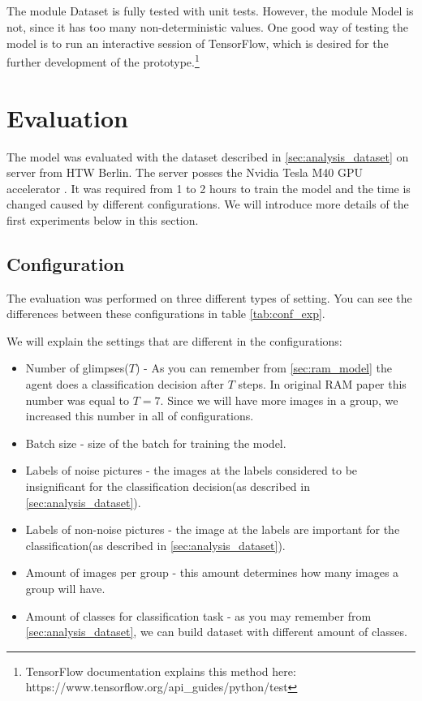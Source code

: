 \subparagraph{} The module Dataset is fully tested with unit tests. However,
the module Model is not, since it has too many non-deterministic values.
One good way of testing the model is to run an interactive session of TensorFlow,
which is desired for the further development of the prototype.\footnote{
TensorFlow documentation explains this method here: https://www.tensorflow.org/api\_guides/python/test
}

\section{Evaluation} The model was evaluated with the dataset described
in \autoref{sec:analysis_dataset} on server from HTW Berlin. The server
posses the Nvidia Tesla M40 GPU accelerator \cite{NVIDIA}.
It was required from 1 to 2 hours to train the model and the time is changed
caused by different configurations.
We will introduce more details of the first experiments below in this section.

\subsection{Configuration}
The evaluation was performed on three different types of setting.
You can see the differences between these configurations
in table \ref{tab:conf_exp}.

We will explain the settings that are different in the configurations:
\begin{itemize}
	\item Number of glimpses($T$) - As you can remember from \autoref{sec:ram_model}
	the agent does a classification decision after $T$ steps. In original RAM
	paper this number was equal to $T=7$. Since we will have more images in a group,
	we increased this number in all of configurations.
	\item Batch size - size of the batch for training the model.
	\item Labels of noise pictures - the images at the labels considered to be
	 	insignificant for the classification decision(as described in \autoref{sec:analysis_dataset}).
	\item Labels of non-noise pictures -  the image at the labels are important
		for the classification(as described in \autoref{sec:analysis_dataset}).

	\item Amount of images per group - this amount determines how many images
	a group will have.
	\item Amount of classes for classification task - as you may remember from
		\autoref{sec:analysis_dataset}, we can build dataset with different
		amount of classes.
\end{itemize}

